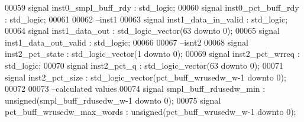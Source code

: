 \begin{DoxyCode}
00059 \textcolor{keywordflow}{signal} \textcolor{vhdlchar}{inst0_smpl_buff_rdy}    \textcolor{vhdlchar}{:} \textcolor{comment}{std\_logic};
00060 \textcolor{keywordflow}{signal} \textcolor{vhdlchar}{inst0_pct_buff_rdy}     \textcolor{vhdlchar}{:} \textcolor{comment}{std\_logic};
00061 
00062 \textcolor{keyword}{--inst1 }
00063 \textcolor{keywordflow}{signal} \textcolor{vhdlchar}{inst1_data_in_valid}    \textcolor{vhdlchar}{:} \textcolor{comment}{std\_logic};
00064 \textcolor{keywordflow}{signal} \textcolor{vhdlchar}{inst1_data_out}         \textcolor{vhdlchar}{:} \textcolor{comment}{std\_logic\_vector}\textcolor{vhdlchar}{(}\textcolor{vhdllogic}{}\textcolor{vhdllogic}{63} \textcolor{keywordflow}{downto} \textcolor{vhdllogic}{}\textcolor{vhdllogic}{0}\textcolor{vhdlchar}{)};
00065 \textcolor{keywordflow}{signal} \textcolor{vhdlchar}{inst1_data_out_valid}   \textcolor{vhdlchar}{:} \textcolor{comment}{std\_logic};
00066 
00067 \textcolor{keyword}{--isnt2}
00068 \textcolor{keywordflow}{signal} \textcolor{vhdlchar}{inst2_pct_state}        \textcolor{vhdlchar}{:} \textcolor{comment}{std\_logic\_vector}\textcolor{vhdlchar}{(}\textcolor{vhdllogic}{}\textcolor{vhdllogic}{1} \textcolor{keywordflow}{downto} \textcolor{vhdllogic}{}\textcolor{vhdllogic}{0}\textcolor{vhdlchar}{)};
00069 \textcolor{keywordflow}{signal} \textcolor{vhdlchar}{inst2_pct_wrreq}        \textcolor{vhdlchar}{:} \textcolor{comment}{std\_logic};
00070 \textcolor{keywordflow}{signal} \textcolor{vhdlchar}{inst2_pct_q}            \textcolor{vhdlchar}{:} \textcolor{comment}{std\_logic\_vector}\textcolor{vhdlchar}{(}\textcolor{vhdllogic}{}\textcolor{vhdllogic}{63} \textcolor{keywordflow}{downto} \textcolor{vhdllogic}{}\textcolor{vhdllogic}{0}\textcolor{vhdlchar}{)};
00071 \textcolor{keywordflow}{signal} \textcolor{vhdlchar}{inst2_pct_size}         \textcolor{vhdlchar}{:} \textcolor{comment}{std\_logic\_vector}\textcolor{vhdlchar}{(}\textcolor{vhdlchar}{pct_buff_wrusedw_w}\textcolor{vhdlchar}{-}\textcolor{vhdllogic}{}\textcolor{vhdllogic}{1} \textcolor{keywordflow}{downto} \textcolor{vhdllogic}{}\textcolor{vhdllogic}{0}\textcolor{vhdlchar}{)};
00072 
00073 \textcolor{keyword}{--calculated values}
00074 \textcolor{keywordflow}{signal} \textcolor{vhdlchar}{smpl_buff_rdusedw_min}        \textcolor{vhdlchar}{:} \textcolor{comment}{unsigned}\textcolor{vhdlchar}{(}\textcolor{vhdlchar}{smpl_buff_rdusedw_w}\textcolor{vhdlchar}{-}\textcolor{vhdllogic}{}\textcolor{vhdllogic}{1} \textcolor{keywordflow}{downto} \textcolor{vhdllogic}{}\textcolor{vhdllogic}{0}\textcolor{vhdlchar}{)};
00075 \textcolor{keywordflow}{signal} \textcolor{vhdlchar}{pct_buff_wrusedw_max_words}   \textcolor{vhdlchar}{:} \textcolor{comment}{unsigned}\textcolor{vhdlchar}{(}\textcolor{vhdlchar}{pct_buff_wrusedw_w}\textcolor{vhdlchar}{-}\textcolor{vhdllogic}{}\textcolor{vhdllogic}{1} \textcolor{keywordflow}{downto} \textcolor{vhdllogic}{}\textcolor{vhdllogic}{0}\textcolor{vhdlchar}{)};

\end{DoxyCode}
